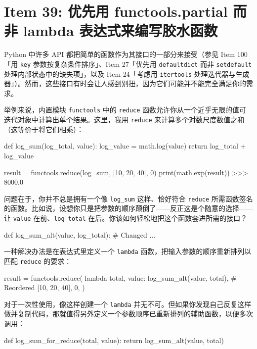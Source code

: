 \section{Item 39: 优先用 functools.partial 而非 lambda 表达式来编写胶水函数}

Python 中许多 API 都把简单的函数作为其接口的一部分来接受（参见 Item 100「用 \texttt{key} 参数按复杂条件排序」、Item 27「优先用 \texttt{defaultdict} 而非 \texttt{setdefault} 处理内部状态中的缺失项」，以及 Item 24「考虑用 \texttt{itertools} 处理迭代器与生成器」）。然而，这些接口有时会让人感到别扭，因为它们可能并不能完全满足你的需求。

举例来说，内置模块 \texttt{functools} 中的 \texttt{reduce} 函数允许你从一个近乎无限的值可迭代对象中计算出单个结果。这里，我用 \texttt{reduce} 来计算多个对数尺度数值之和（这等价于将它们相乘）：

\begin{codebox}[python]
def log_sum(log_total, value):
    log_value = math.log(value)
    return log_total + log_value

result = functools.reduce(log_sum, [10, 20, 40], 0)
print(math.exp(result))
>>>
8000.0
\end{codebox}

问题在于，你并不总是拥有一个像 \texttt{log\_sum} 这样、恰好符合 \texttt{reduce} 所需函数签名的函数。比如说，设想你只是把参数的顺序颠倒了——反正这是个随意的选择——让 \texttt{value} 在前、\texttt{log\_total} 在后。你该如何轻松地把这个函数套进所需的接口？

\begin{codebox}[python]
def log_sum_alt(value, log_total):  # Changed
    ...
\end{codebox}

一种解决办法是在表达式里定义一个 \texttt{lambda} 函数，把输入参数的顺序重新排列以匹配 \texttt{reduce} 的要求：

\begin{codebox}[python]
result = functools.reduce(
    lambda total, value: log_sum_alt(value, total),  # Reordered
    [10, 20, 40],
    0,
)
\end{codebox}

对于一次性使用，像这样创建一个 \texttt{lambda} 并无不可。但如果你发现自己反复这样做并复制代码，那就值得另外定义一个参数顺序已重新排列的辅助函数，以便多次调用：

\begin{codebox}[python]
def log_sum_for_reduce(total, value):
    return log_sum_alt(value, total)
\end{codebox}

